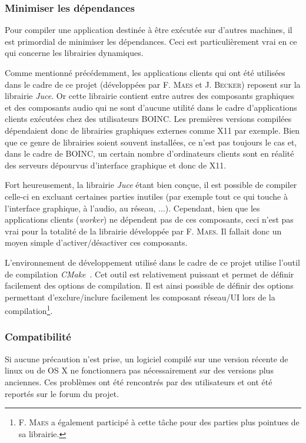 \documentclass[a4paper, 12pt]{report}
\begin{document}
\subsubsection{Minimiser les dépendances}
Pour compiler une application destinée à être exécutée sur d'autres machines, il est primordial de minimiser les dépendances. Ceci est particulièrement vrai en ce qui concerne les librairies dynamiques.

Comme mentionné précédemment, les applications clients qui ont été utilisées dans le cadre de ce projet (développées par F. \textsc{Maes} et J. \textsc{Becker}) reposent sur la librairie \textit{Juce}. Or cette librairie contient entre autres des composants graphiques et des composants audio qui ne sont d'aucune utilité dans le cadre d'applications clients exécutées chez des utilisateurs \textsc{BOINC}. Les premières versions compilées dépendaient donc de librairies graphiques externes comme X11 par exemple. Bien que ce genre de librairies soient souvent installées, ce n'est pas toujours le cas et, dans le cadre de \textsc{BOINC}, un certain nombre d'ordinateurs clients sont en réalité des serveurs dépourvus d'interface graphique et donc de X11.

Fort heureusement, la librairie \textit{Juce} étant bien conçue, il est possible de compiler celle-ci en excluant certaines parties inutiles (par exemple tout ce qui touche à l'interface graphique, à l'audio, au réseau, ...). Cependant, bien que les applications clients (\textit{worker}) ne dépendent pas de ces composants, ceci n'est pas vrai pour la totalité de la librairie développée par F. \textsc{Maes}. Il fallait donc un moyen simple d'activer/désactiver ces composants. 

L'environnement de développement utilisé dans le cadre de ce projet utilise l'outil de compilation \textit{CMake}~\cite{CMAKE}. Cet outil est relativement puissant et permet de définir facilement des options de compilation. Il est ainsi possible de définir des options permettant d'exclure/inclure facilement les composant réseau/UI lors de la compilation\footnote{F. \textsc{Maes} a également participé à cette tâche pour des parties plus pointues de sa librairie.}.  

\subsubsection{Compatibilité}
Si aucune précaution n'est prise, un logiciel compilé sur une version récente de linux ou de OS X ne fonctionnera pas nécessairement sur des versions plus anciennes. Ces problèmes ont été rencontrés par des utilisateurs et ont été reportés sur le forum du projet.
\end{document}
